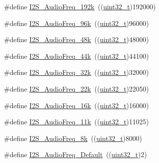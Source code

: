 \begin{DoxyCompactItemize}
\item 
\#define \hyperlink{group___i2_s___audio___frequency_gadfdaed9a2acb71f2cdd737be81a6f747}{I2\+S\+\_\+\+Audio\+Freq\+\_\+192k}~((\hyperlink{_p_e___types_8h_a33594304e786b158f3fb30289278f5af}{uint32\+\_\+t})192000)
\item 
\#define \hyperlink{group___i2_s___audio___frequency_ga5acd02a974e90bb8f2c4e07f8fa0231b}{I2\+S\+\_\+\+Audio\+Freq\+\_\+96k}~((\hyperlink{_p_e___types_8h_a33594304e786b158f3fb30289278f5af}{uint32\+\_\+t})96000)
\item 
\#define \hyperlink{group___i2_s___audio___frequency_gac5f3f0416f9dd03d680d0fcee93b50ab}{I2\+S\+\_\+\+Audio\+Freq\+\_\+48k}~((\hyperlink{_p_e___types_8h_a33594304e786b158f3fb30289278f5af}{uint32\+\_\+t})48000)
\item 
\#define \hyperlink{group___i2_s___audio___frequency_ga3514e4c292b92b8a7d8a6916f4e3690c}{I2\+S\+\_\+\+Audio\+Freq\+\_\+44k}~((\hyperlink{_p_e___types_8h_a33594304e786b158f3fb30289278f5af}{uint32\+\_\+t})44100)
\item 
\#define \hyperlink{group___i2_s___audio___frequency_gac501b566718f4890aaafa323a33b732c}{I2\+S\+\_\+\+Audio\+Freq\+\_\+32k}~((\hyperlink{_p_e___types_8h_a33594304e786b158f3fb30289278f5af}{uint32\+\_\+t})32000)
\item 
\#define \hyperlink{group___i2_s___audio___frequency_gac6adafe5586e83c2408f1eab8edb4ab3}{I2\+S\+\_\+\+Audio\+Freq\+\_\+22k}~((\hyperlink{_p_e___types_8h_a33594304e786b158f3fb30289278f5af}{uint32\+\_\+t})22050)
\item 
\#define \hyperlink{group___i2_s___audio___frequency_ga5b8f2f8393e022becf0dbb04d1b01950}{I2\+S\+\_\+\+Audio\+Freq\+\_\+16k}~((\hyperlink{_p_e___types_8h_a33594304e786b158f3fb30289278f5af}{uint32\+\_\+t})16000)
\item 
\#define \hyperlink{group___i2_s___audio___frequency_ga3adf95fadd1ad75670ed1babd5faca39}{I2\+S\+\_\+\+Audio\+Freq\+\_\+11k}~((\hyperlink{_p_e___types_8h_a33594304e786b158f3fb30289278f5af}{uint32\+\_\+t})11025)
\item 
\#define \hyperlink{group___i2_s___audio___frequency_ga7868ac234485a80d45586dd87cd00043}{I2\+S\+\_\+\+Audio\+Freq\+\_\+8k}~((\hyperlink{_p_e___types_8h_a33594304e786b158f3fb30289278f5af}{uint32\+\_\+t})8000)
\item 
\#define \hyperlink{group___i2_s___audio___frequency_ga30f78e8214e8a91cdb6d6360c1d3f18d}{I2\+S\+\_\+\+Audio\+Freq\+\_\+\+Default}~((\hyperlink{_p_e___types_8h_a33594304e786b158f3fb30289278f5af}{uint32\+\_\+t})2)
\item 

\end{DoxyCompactItemize}
